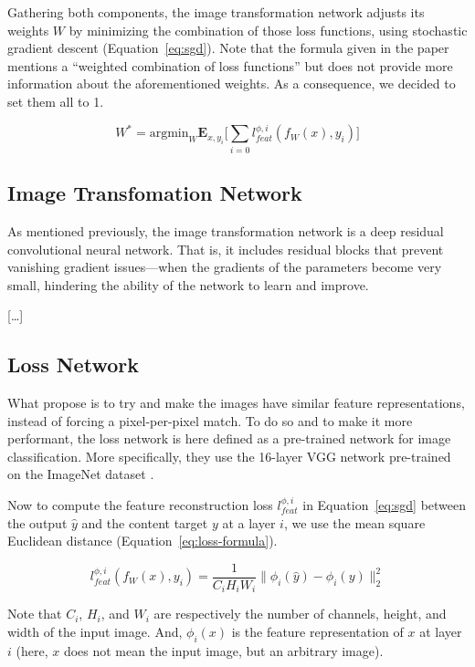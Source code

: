 \documentclass{article}
\begin{document}
{    \bigskip

    Gathering both components, the image transformation network adjusts its weights $W$ by minimizing the combination of those loss functions, using stochastic gradient descent (Equation~\ref{eq:sgd}). Note that the formula given in the paper \citep{sr} mentions a “weighted combination of loss functions” but does not provide more information about the aforementioned weights. As a consequence, we decided to set them all to 1.

    \begin{equation}
        W^* = \text{argmin}_W \textbf{E}_{x,y_i} \biggl[ \sum_{i=0} l^{\phi, i}_{feat}(f_W(x), y_i) \biggr]
        \label{eq:sgd}
    \end{equation}

    \subsection{Image Transfomation Network}
    \label{subsec:image-transformation-network-method}

    As mentioned previously, the image transformation network is a deep residual convolutional neural network. That is, it includes residual blocks that prevent vanishing gradient issues---when the gradients of the parameters become very small, hindering the ability of the network to learn and improve.

    \bigskip

    […]

    \subsection{Loss Network}
    \label{subsec:loss-network-method}

    What propose \cite{sr} is to try and make the images have similar feature representations, instead of forcing a pixel-per-pixel match. To do so and to make it more performant, the loss network is here defined as a pre-trained network for image classification. More specifically, they use the 16-layer VGG network \citep{vgg} pre-trained on the ImageNet dataset \citep{image-net}.

    Now to compute the feature reconstruction loss $l^{\phi, i}_{feat}$ in Equation~\ref{eq:sgd} between the output $\hat y$ and the content target $y$ at a layer $i$, we use the mean square Euclidean distance (Equation~\ref{eq:loss-formula}).

    \begin{equation}
        l^{\phi, i}_{feat}(f_W(x), y_i) = \frac{1}{C_i H_i W_i} \lVert \phi_i (\hat y) - \phi_i (y) \rVert_2^2
        \label{eq:loss-formula}
    \end{equation}

    Note that $C_i$, $H_i$, and $W_i$ are respectively the number of channels, height, and width of the input image. And, $\phi_i (x)$ is the feature representation of $x$ at layer $i$ (here, $x$ does not mean the input image, but an arbitrary image).
}
\end{document}
